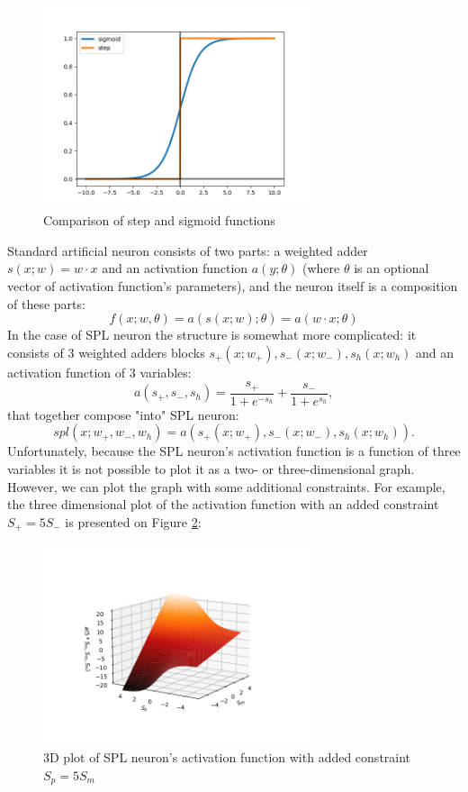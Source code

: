 \documentclass[sn-apa]{sn-jnl}%
\begin{document}
\begin{figure}[H]
\centering
\includegraphics[width=0.7\textwidth]{Fig3.png}
\caption{Comparison of step and sigmoid functions}\label{fig3}
\end{figure}

Standard artificial neuron consists of two parts: a weighted adder $s(x;w) = w \cdot x$ and an activation function $a(y; \theta)$ (where $\theta$ is an optional vector of activation function's parameters), and the neuron itself is a composition of these parts:
\begin{equation}
f(x;w,\theta)=a(s(x;w);\theta)=a(w \cdot x; \theta) \label{eq10}
\end{equation}
In the case of SPL neuron the structure is somewhat more complicated: it consists of 3 weighted adders blocks $s_+(x;w_+),s_-(x;w_-),s_h(x;w_h)$ and an activation function of 3 variables:
\begin{equation}
a(s_+,s_-,s_h) = \frac{s_+}{1 + e^{-s_h}} + \frac{s_-}{1 + e^{s_h}}, \label{eq11}
\end{equation}
that together compose "into" SPL neuron:
\begin{equation}
 spl(x;w_+,w_-,w_h) = a(s_+(x;w_+),s_-(x;w_-),s_h(x;w_h)). \label{eq12}
 \end{equation}
 Unfortunately, because the SPL neuron's activation function is a function of three variables it is not  possible to plot it as a two- or three-dimensional graph. However, we can plot the graph with some additional constraints. For example, the three dimensional plot of the activation function with an added constraint $S_+=5S_-$ is presented on Figure \ref{fig4}:

\begin{figure}[H]
\centering
\includegraphics[width=0.7\textwidth]{Fig4.png}
\caption{3D plot of SPL neuron's activation function with added constraint $S_p=5S_m$}\label{fig4}
\end{figure}
\end{document}
